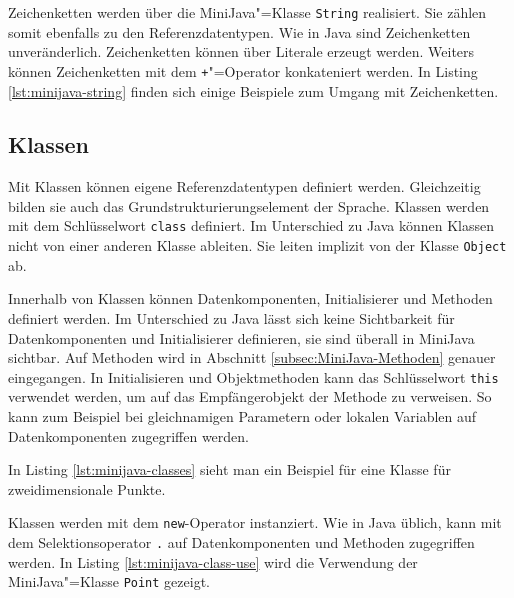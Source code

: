 Zeichenketten werden über die MiniJava"=Klasse \lstinline{String} realisiert. Sie zählen somit ebenfalls zu den Referenzdatentypen. Wie in Java sind Zeichenketten unveränderlich. Zeichenketten können über Literale erzeugt werden. Weiters können Zeichenketten mit dem \lstinline{+}"=Operator konkateniert werden. In Listing \ref{lst:minijava-string} finden sich einige Beispiele zum Umgang mit Zeichenketten.



\subsection{Klassen}
\label{subsec:MiniJava-Klassen}

Mit Klassen können eigene Referenzdatentypen definiert werden. Gleichzeitig bilden sie auch das Grundstrukturierungselement der Sprache. Klassen werden mit dem Schlüsselwort \lstinline{class} definiert. Im Unterschied zu Java können Klassen nicht von einer anderen Klasse ableiten. Sie leiten implizit von der Klasse \lstinline{Object} ab.

Innerhalb von Klassen können Datenkomponenten, Initialisierer und Methoden definiert werden. Im Unterschied zu Java lässt sich keine Sichtbarkeit für Datenkomponenten und Initialisierer definieren, sie sind überall in MiniJava sichtbar. Auf Methoden wird in Abschnitt \ref{subsec:MiniJava-Methoden} genauer eingegangen. In Initialisieren und Objektmethoden kann das Schlüsselwort \lstinline{this} verwendet werden, um auf das Empfängerobjekt der Methode zu verweisen. So kann zum Beispiel bei gleichnamigen Parametern oder lokalen Variablen auf Datenkomponenten zugegriffen werden.

In Listing \ref{lst:minijava-classes} sieht man ein Beispiel für eine Klasse für zweidimensionale Punkte.



Klassen werden mit dem \lstinline{new}-Operator instanziert. Wie in Java üblich, kann mit dem Selektionsoperator \lstinline{.} auf Datenkomponenten und Methoden zugegriffen werden. In Listing \ref{lst:minijava-class-use} wird die Verwendung der MiniJava"=Klasse \lstinline{Point} gezeigt.



